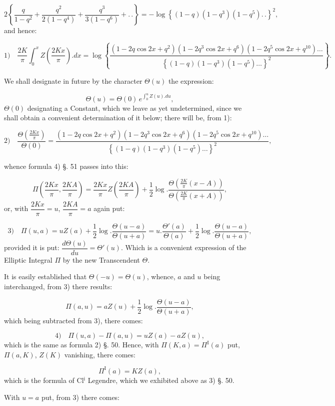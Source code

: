 \documentclass{article}
\begin{document}
\[
2\left\{\frac{q}{1-q^{2}}+\frac{q^{2}}{2(1-q^{4})}+\frac{q^{3}}{3(1-q^{6})}+.\,.\right\}=-\log\left\{(1-q)(1-q^{3})(1-q^{5}).\,.\right\}^{2},
\]
and hence:

\[
\text{1)}\quad \frac{2K}{\pi}\int_{0}^{x}Z\left(\frac{2Kx}{\pi}\right).dx=\log\left\{\frac{(1-2q\cos2x+q^{2})(1-2q^{3}\cos2x+q^{6})(1-2q^{5}\cos2x+q^{10})\ldots}{\left\{(1-q)(1-q^{3})(1-q^{5})\ldots\right\}^{2}}\right\}.
\]

We shall designate in future by the character $\Theta(u)$ the expression:

\[
\Theta(u)=\Theta(0)\,e^{\int_{0}^{u}Z(u).du},
\]
$\Theta(0)$ designating a Constant, which we leave as yet undetermined, since we shall obtain a convenient determination of it below; there will be, from 1):

\[
\text{2)}\quad \frac{\Theta\left(\frac{2Kx}{\pi}\right)}{\Theta(0)}=\frac{(1-2q\cos2x+q^{2})(1-2q^{3}\cos2x+q^{6})(1-2q^{5}\cos2x+q^{10})\ldots}{\left\{(1-q)(1-q^{3})(1-q^{5})\ldots\right\}^{2}},
\]

whence formula 4) §. 51 passes into this:

\[
\Pi\left(\frac{2Kx}{\pi},\frac{2KA}{\pi}\right)=\frac{2Kx}{\pi}Z\left(\frac{2KA}{\pi}\right)+\frac{1}{2}\log.\frac{\Theta\left(\frac{2K}{\pi}(x-A)\right)}{\Theta\left(\frac{2K}{\pi}(x+A)\right)},
\]
or, with $\dfrac{2Kx}{\pi}=u$, $\dfrac{2KA}{\pi}=a$ again put:

\[
\text{3)}\quad \Pi(u,a)=uZ(a)+\frac{1}{2}\log.\frac{\Theta(u-a)}{\Theta(u+a)}=u.\frac{\Theta'(a)}{\Theta(a)}+\frac{1}{2}\log.\frac{\Theta(u-a)}{\Theta(u+a)},
\]
provided it is put: $\dfrac{d\Theta(u)}{du}=\Theta'(u)$. Which is a convenient expression of the Elliptic Integral $\Pi$ by the new Transcendent $\Theta$.

It is easily established that $\Theta(-u)=\Theta(u)$, whence, $a$ and $u$ being interchanged, from 3) there results:

\[
\Pi(a,u)=aZ(u)+\frac{1}{2}\log.\frac{\Theta(u-a)}{\Theta(u+a)},
\]
which being subtracted from 3), there comes:

\[
\text{4)}\quad \Pi(u,a)-\Pi(a,u)=uZ(a)-aZ(u),
\]
which is the same as formula 2) §. 50. Hence, with $\Pi(K,a)=\Pi^{\mathrm{I}}(a)$ put, $\Pi(a,K)$, $Z(K)$ vanishing, there comes:

\[
\Pi^{\mathrm{I}}(a)=KZ(a),
\]
which is the formula of Cl$^{\mathrm{i}}$ Legendre, which we exhibited above as 3) §. 50.

With $u=a$ put, from 3) there comes:
\end{document}
